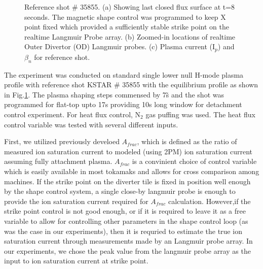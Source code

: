 \begin{figure}[!ht]
 \caption{Reference shot \# 35855. (a) Showing last closed flux surface at t=8 seconds. The magnetic shape control was programmed to keep X point fixed which provided a sufficiently stable strike point on the realtime Langmuir Probe array. (b) Zoomed-in locations of realtime Outer Divertor (OD) Langmuir probes. (c) Plasma current (I$_p$) and $\beta_n$ for reference shot.}
 \label{fig:ref_shot}
\end{figure}

The experiment was conducted on standard single lower null H-mode plasma profile with reference shot KSTAR \# 35855 with the equilibrium profile as shown in Fig.\ref{fig:ref_shot}. The plasma shaping steps commensed by 7\~s and the shot was programmed for flat-top upto 17s providing 10s long window for detachment control experiment. For heat flux control, N$_2$ gas puffing was used. The heat flux control variable was tested with several different inputs.

First, we utilized previously develoed $A_{frac}$\cite{Eldon_2022_PPCF}, which is defined as the ratio of measured ion saturation current to modeled (using 2PM\cite{Leonard_2018_PPCF}) ion saturation current assuming fully attachment plasma. $A_{frac}$ is a convinient choice of control variable which is easily available in most tokamaks and allows for cross comparison among machines. If the strike point on the diverter tile is fixed in position well enough by the shape control system, a single close-by langmuir probe is enough to provide the ion saturation current required for $A_{frac}$ calculation. However,if the strike point control is not good enough, or if it is required to leave it as a free variable to allow for controlling other parameters in the shape control loop (as was the case in our experiments), then it is requried to estimate the true ion saturation current through measurements made by an Langmuir probe array. In our experiments, we chose the peak value from the langmuir probe array as the input to ion saturation current at strike point.

